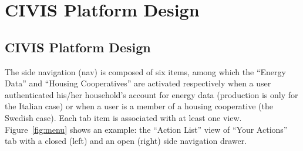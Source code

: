 
\section{CIVIS Platform Design}




\subsection{CIVIS Platform Design}






%
%
%
%
%

The side navigation (nav) is composed of six items, among which the ``Energy Data'' and ``Housing Cooperatives'' are activated respectively when a user authenticated his/her household's account for energy data (production is only for the Italian case) or when a user is a member of a housing cooperative (the Swedish case). Each tab item is associated with at least one view. Figure~\ref{fig:menu} shows an example: the ``Action List'' view of ``Your Actions'' tab with a closed (left) and an open (right) side navigation drawer. 

